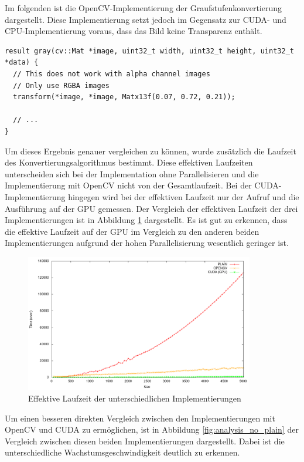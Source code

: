 \documentclass{llncs}
\begin{document}
Im folgenden ist die OpenCV-Implementierung der Graufstufenkonvertierung dargestellt. Diese Implementierung setzt jedoch im Gegensatz zur CUDA- und CPU-Implementierung voraus, dass das Bild keine Transparenz enthält.

\begin{lstlisting}
result gray(cv::Mat *image, uint32_t width, uint32_t height, uint32_t *data) {
  // This does not work with alpha channel images
  // Only use RGBA images
  transform(*image, *image, Matx13f(0.07, 0.72, 0.21));

  // ...
}
\end{lstlisting}

Um dieses Ergebnis genauer vergleichen zu können, wurde zusätzlich die Laufzeit des Konvertierungsalgorithmus bestimmt. Diese effektiven Laufzeiten unterscheiden sich bei der Implementation ohne Parallelisieren und die Implementierung mit OpenCV nicht von der Gesamtlaufzeit. Bei der CUDA-Implementierung hingegen wird bei der effektiven Laufzeit nur der Aufruf und die Ausführung auf der GPU gemessen. Der Vergleich der effektiven Laufzeit der drei Implementierungen ist in Abbildung \ref{fig:analysis_gpu} dargestellt. Es ist gut zu erkennen, dass die effektive Laufzeit auf der GPU im Vergleich zu den anderen beiden Implementierungen aufgrund der hohen Parallelisierung wesentlich geringer ist.

\begin{figure}
	\centering
	\includegraphics[width=10cm,keepaspectratio]{analysis_gpu.png}
	\caption{Effektive Laufzeit der unterschiedlichen Implementierungen}
	\label{fig:analysis_gpu}
\end{figure}
\newpage
Um einen besseren direkten Vergleich zwischen den Implementierungen mit OpenCV und CUDA zu ermöglichen, ist in Abbildung \ref{fig:analysis_no_plain} der Vergleich zwischen diesen beiden Implementierungen dargestellt. Dabei ist die unterschiedliche Wachstumsgeschwindigkeit deutlich zu erkennen.
\end{document}
